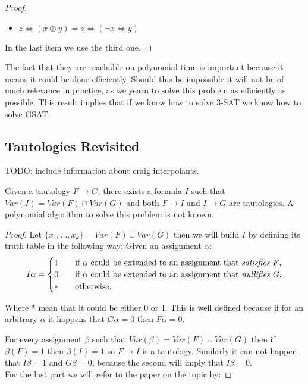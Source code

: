\begin{proof}
\begin{itemize}
    \item $z \iff( x \oplus y ) =  z \iff(\neg  x \iff y )  $	

    \end{itemize}
    In the last item we use the third one.
    
  \end{proof}

  The fact that they are reachable on polynomial time is important because it means it could be done efficiently. Should this be impossible it will not be of much relevance in practice, as we yearn to solve this problem as efficiently as possible. This result implies that if we know how to solve $3$-SAT we know how to solve GSAT.


  \subsection{Tautologies Revisited}

  TODO: include information about craig interpolants.
  \begin{proposition}
    Given a tautology $F \to G$, there exists a formula $I$ such that $Var(I) = Var(F)\cap Var(G)$ and both $F\to I$ and $I \to G$ are tautologies. A polynomial algorithm to solve this problem is not known. 
  \end{proposition}

  \begin{proof} Let $\{x_1,...,x_k\} = Var(F)\cup Var(G)$ then we will build $I$ by defining its truth table in the following way: Given an assignment $\alpha$:
    \[   
      I\alpha = 
      \begin{cases}
        1&\quad\text{if $\alpha$ could be extended to an assignment that \emph{satisfies} $F$}, \\
        0&\quad\text{if $\alpha$ could be extended to an assignment that \emph{nullifies} $G$},\\
        * &\quad\text{otherwise.} \\ 
      \end{cases}
    \]

    Where * mean that it could be either 0 or 1.  This is well defined because if for an arbitrary $\alpha$ it happens that $G\alpha = 0$ then $F\alpha = 0$.

    For every assignment $\beta$ such that $Var(\beta) = Var(F)\cup Var(G)$ then if $\beta(F) = 1$ then $\beta(I) = 1$ so $F \to I$  is a tautology. Similarly it can not happen that $I\beta = 1 $ and $G\beta = 0$, because the second will imply that   $I\beta = 0$.\\

    For the last part we will refer to the paper on the topic by: 
  \end{proof}

